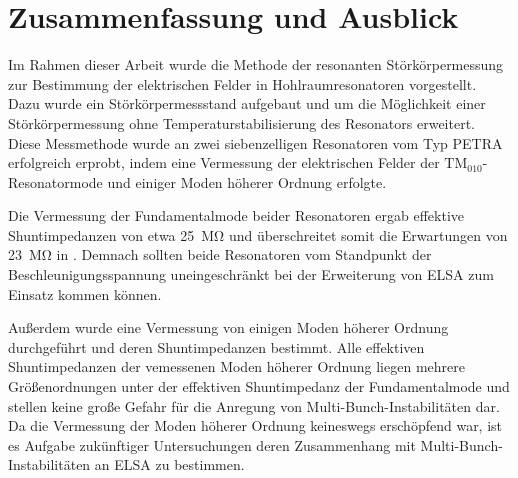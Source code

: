 \chapter{Zusammenfassung und Ausblick}
\label{sec:fazit}
Im Rahmen dieser Arbeit wurde die Methode der resonanten Störkörpermessung zur Bestimmung der elektrischen Felder in Hohlraumresonatoren vorgestellt.
Dazu wurde ein Störkörpermessstand aufgebaut und um die Möglichkeit einer Störkörpermessung ohne Temperaturstabilisierung des Resonators erweitert.
Diese Messmethode wurde an zwei siebenzelligen Resonatoren vom Typ PETRA erfolgreich erprobt, indem eine Vermessung der elektrischen Felder der $\mathrm{TM}_{010}$-Resonatormode und einiger Moden höherer Ordnung erfolgte.

Die Vermessung der Fundamentalmode beider Resonatoren ergab effektive Shuntimpedanzen von etwa \SI{25}{\mega\ohm} und überschreitet somit die Erwartungen von \SI{23}{\mega\ohm} in \cite{schedler}.
Demnach sollten beide Resonatoren vom Standpunkt der Beschleunigungsspannung uneingeschränkt bei der Erweiterung von ELSA zum Einsatz kommen können.

Außerdem wurde eine Vermessung von einigen Moden höherer Ordnung durchgeführt und deren Shuntimpedanzen bestimmt.
Alle effektiven Shuntimpedanzen der vemessenen Moden höherer Ordnung liegen mehrere Größenordnungen unter der effektiven Shuntimpedanz der Fundamentalmode und stellen keine große Gefahr für die Anregung von Multi-Bunch-Instabilitäten dar.
Da die Vermessung der Moden höherer Ordnung keineswegs erschöpfend war, ist es Aufgabe zukünftiger Untersuchungen deren Zusammenhang mit Multi-Bunch-Instabilitäten an ELSA zu bestimmen.
